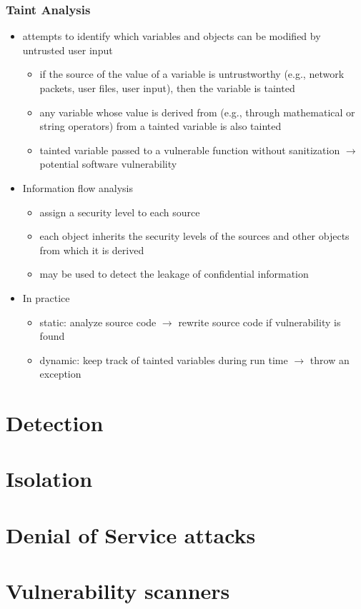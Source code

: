 \documentclass[final]{article}
\begin{document}
\subsubsection*{Taint Analysis}
\begin{itemize}[nosep]
    \item attempts to identify which variables and objects can be modified by untrusted user input
          \begin{itemize}[nosep]
              \item if the source of the value of a variable is untrustworthy (e.g., network packets, user files, user input), then the variable is tainted
              \item any variable whose value is derived from (e.g., through mathematical or string operators) from a tainted variable is also tainted
              \item tainted variable passed to a vulnerable function without sanitization $\rightarrow$ potential software vulnerability
          \end{itemize}
    \item Information flow analysis
          \begin{itemize}[nosep]
              \item assign a security level to each source
              \item each object inherits the security levels of the sources and other objects from which it is derived
              \item may be used to detect the leakage of confidential information
          \end{itemize}
    \item In practice
          \begin{itemize}[nosep]
              \item static: analyze source code $\rightarrow$ rewrite source code if vulnerability is found
              \item dynamic: keep track of tainted variables during run time $\rightarrow$ throw an exception
          \end{itemize}
\end{itemize}
\section{Detection}
\section{Isolation}
\section{Denial of Service attacks}
\section{Vulnerability scanners}
\end{document}
